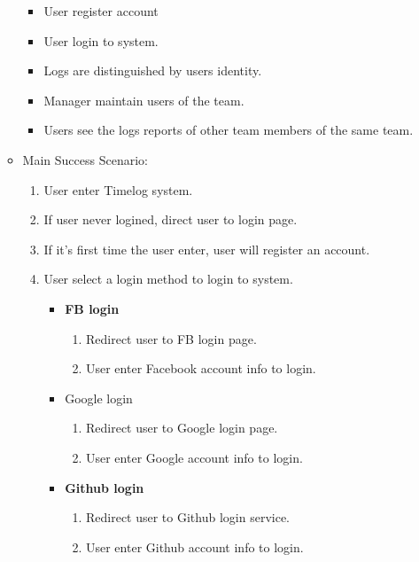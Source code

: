 \documentclass[12pt, a4paper]{article}
\begin{document}
\begin{CJK*}{UTF8}{bkai}
\begin{itemize}
\begin{itemize}
            \begin{itemize}
              \item User register account
              \item User login to system.
              \item Logs are distinguished by users identity.
              \item Manager maintain users of the team.
              \item Users see the logs reports of other team members of the same team.
            \end{itemize}
          \item Main Success Scenario:
            \begin{enumerate}
              \item User enter Timelog system.
              \item If user never logined, direct user to login page.
              \item If it's first time the user enter, user will register an account.
              \item User select a login method to login to system.
                \begin{itemize}
                  \item {\bf FB login}
                    \begin{enumerate}
                      \item Redirect user to FB login page.
                      \item User enter Facebook account info to login.
                    \end{enumerate}
                  \item {Google login}
                    \begin{enumerate}
                      \item Redirect user to Google login page.
                      \item User enter Google account info to login.
                    \end{enumerate}
                  \item {\bf Github login}
                    \begin{enumerate}
                      \item Redirect user to Github login service.
                      \item User enter Github account info to login.
                    \end{enumerate}

\end{itemize}
\end{enumerate}
\end{itemize}
\end{itemize}
\end{CJK*}
\end{document}

